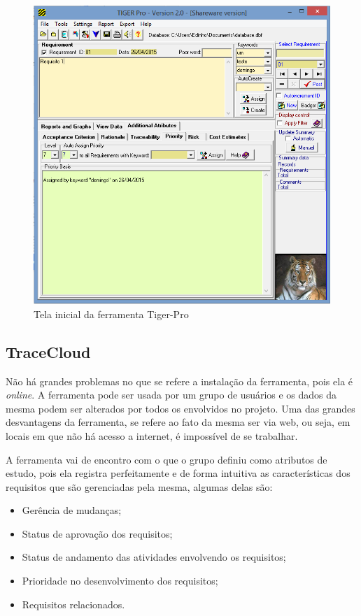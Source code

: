 \begin{figure}[!htb]
\centering
\includegraphics[scale=0.6]{figuras/tiger-pro.png}
\caption{Tela inicial da ferramenta Tiger-Pro}
\end{figure}

\subsection{TraceCloud}
Não há grandes problemas no que se refere a instalação da ferramenta, pois ela é \textit{online}. A ferramenta pode ser usada por um grupo de usuários e os dados da mesma podem ser alterados por todos os envolvidos no projeto. Uma das grandes desvantagens da ferramenta, se refere ao fato da mesma ser via web, ou seja, em locais em que não há acesso a internet, é impossível de se trabalhar.

A ferramenta vai de encontro com o que o grupo definiu como atributos de estudo, pois ela registra perfeitamente e de forma intuitiva as características dos requisitos que são gerenciadas pela mesma, algumas delas são:
\begin{itemize}
  \item Gerência de mudanças;
  \item Status de aprovação dos requisitos;
  \item Status de andamento das atividades envolvendo os requisitos;
  \item Prioridade no desenvolvimento dos requisitos;
  \item Requisitos relacionados.
\end{itemize}

